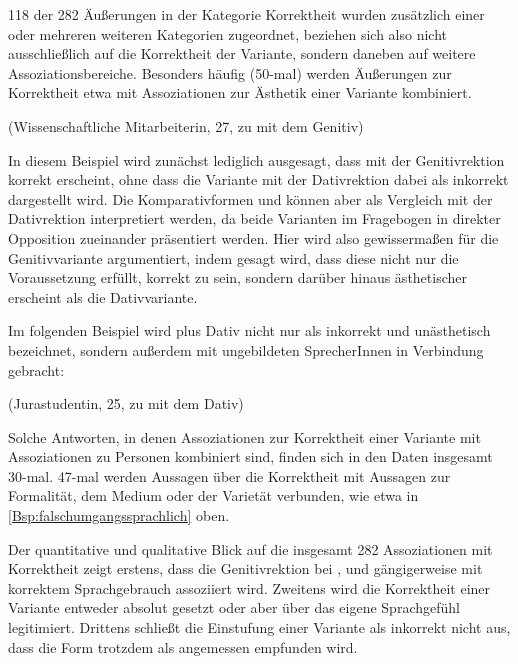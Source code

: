 118 der 282 Äußerungen in der Kategorie \glqq Korrektheit\grqq{} wurden zusätzlich einer oder mehreren weiteren Kategorien zugeordnet, beziehen sich also nicht ausschließlich auf die Korrektheit der Variante, sondern daneben auf weitere Assoziationsbereiche. 
Besonders häufig (50-mal) werden Äußerungen zur Korrektheit etwa mit Assoziationen zur Ästhetik einer Variante kombiniert. 
\begin{exe}
\ex {} (Wissenschaftliche Mitarbeiterin, 27, zu \dank{} mit dem Genitiv)
\end{exe} 
In diesem Beispiel wird zunächst lediglich ausgesagt, dass \dank{} mit der Genitivrektion korrekt erscheint, ohne dass die Variante mit der Dativrektion dabei als inkorrekt dargestellt wird. 
Die Komparativformen  und  können aber als Vergleich mit der Dativrektion interpretiert werden, da beide Varianten im Fragebogen in direkter Opposition zueinander präsentiert werden. 
Hier wird also gewissermaßen für die Genitivvariante argumentiert, indem gesagt wird, dass diese nicht nur die Voraussetzung erfüllt, korrekt zu sein, sondern darüber hinaus ästhetischer erscheint als die Dativvariante. 

Im folgenden Beispiel wird \waehrend{} plus Dativ nicht nur als inkorrekt und unästhetisch bezeichnet, sondern außerdem mit ungebildeten SprecherInnen in Verbindung gebracht: 
\begin{exe}
\ex {} (Jurastudentin, 25, zu \waehrend{} mit dem Dativ) \label{Bsp:hohleBirne}
\end{exe}
Solche Antworten, in denen Assoziationen zur Korrektheit einer Variante mit Assoziationen zu Personen kombiniert sind, finden sich in den Daten insgesamt 30-mal. 
47-mal werden Aussagen über die Korrektheit mit Aussagen zur Formalität, dem Medium oder der Varietät verbunden, wie etwa in \autoref{Bsp:falschumgangssprachlich} oben. 

Der quantitative und qualitative Blick auf die insgesamt 282 Assoziationen mit Korrektheit zeigt erstens, dass die Genitivrektion bei \wegen, \waehrend{} und \dank{} gängigerweise mit korrektem Sprachgebrauch assoziiert wird. 
Zweitens wird die Korrektheit einer Variante entweder absolut gesetzt oder aber über das eigene Sprachgefühl legitimiert. 
Drittens schließt die Einstufung einer Variante als inkorrekt nicht aus, dass die Form trotzdem als angemessen empfunden wird. 
